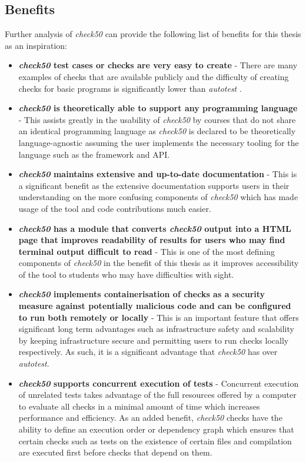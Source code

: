 \documentclass[hidelinks]{report}
\begin{document}
\subsection{Benefits}

Further analysis of \textit{check50} can provide the following list of benefits for this thesis as an inspiration:
\begin{itemize}
	\item \textbf{\textit{check50} test cases or checks are very easy to create} - There are many examples of checks that are available publicly and the difficulty of creating checks for basic programs is significantly lower than \textit{autotest} \cite{check50Examples}.
	\item \textbf{\textit{check50} is theoretically able to support any programming language} - This assists greatly in the usability of \textit{check50} by courses that do not share an identical programming language as \textit{check50} is declared to be theoretically language-agnostic assuming the user implements the necessary tooling for the language such as the framework and API.
	\item \textbf{\textit{check50} maintains extensive and up-to-date documentation} - This is a significant benefit as the extensive documentation supports users in their understanding on the more confusing components of \textit{check50} which has made usage of the tool and code contributions much easier.
	\item \textbf{\textit{check50} has a module that converts \textit{check50} output into a HTML page that improves readability of results for users who may find terminal output difficult to read} - This is one of the most defining components of \textit{check50} in the benefit of this thesis as it improves accessibility of the tool to students who may have difficulties with sight.
	\item \textbf{\textit{check50} implements containerisation of checks as a security measure against potentially malicious code and can be configured to run both remotely or locally} - This is an important feature that offers significant long term advantages such as infrastructure safety and scalability by keeping infrastructure secure and permitting users to run checks locally respectively. As such, it is a significant advantage that \textit{check50} has over \textit{autotest}.
	\item \textbf{\textit{check50} supports concurrent execution of tests} - Concurrent execution of unrelated tests takes advantage of the full resources offered by a computer to evaluate all checks in a minimal amount of time which increases performance and efficiency. As an added benefit, \textit{check50} checks have the ability to define an execution order or dependency graph which ensures that certain checks such as tests on the existence of certain files and compilation are executed first before checks that depend on them. 
\end{itemize} 
\end{document}
